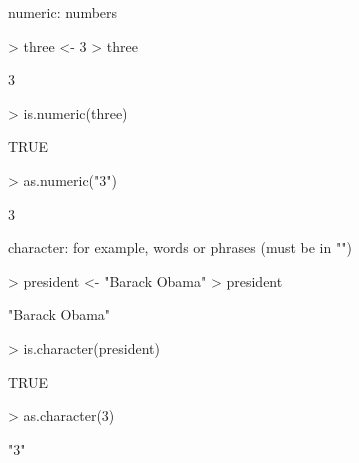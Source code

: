 \documentclass[handout]{beamer}
\newcommand{\red}{\color{red}}
\newcommand{\black}{\color{black}}
\begin{document}
\begin{frame}[fragile]
numeric: numbers
\pause
\bigskip
\red
\begin{Schunk}
\begin{Sinput}
> three <- 3
> three
\end{Sinput}
\begin{Soutput}
[1] 3
\end{Soutput}
\end{Schunk}
\pause
\bigskip
\begin{Schunk}
\begin{Sinput}
> is.numeric(three)
\end{Sinput}
\begin{Soutput}
[1] TRUE
\end{Soutput}
\end{Schunk}
\pause
\bigskip
\begin{Schunk}
\begin{Sinput}
> as.numeric("3")
\end{Sinput}
\begin{Soutput}
[1] 3
\end{Soutput}
\end{Schunk}
\black
\end{frame}

\begin{frame}[fragile]
character: for example, words or phrases (must be in "")
\pause
\bigskip
\red
\begin{Schunk}
\begin{Sinput}
> president <- "Barack Obama"
> president
\end{Sinput}
\begin{Soutput}
[1] "Barack Obama"
\end{Soutput}
\end{Schunk}
\pause
\bigskip
\begin{Schunk}
\begin{Sinput}
> is.character(president)
\end{Sinput}
\begin{Soutput}
[1] TRUE
\end{Soutput}
\end{Schunk}
\pause
\bigskip
\begin{Schunk}
\begin{Sinput}
> as.character(3)
\end{Sinput}
\begin{Soutput}
[1] "3"
\end{Soutput}
\end{Schunk}
\black
\end{frame}
\end{document}
